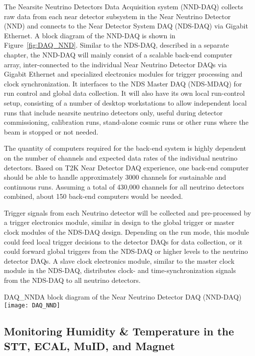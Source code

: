 The Nearsite Neutrino Detectors Data Acquisition system (NND-DAQ) collects raw data from 
each near detector subsystem in the Near Neutrino Detector (NND) and connects to the Near 
Detector System DAQ (NDS-DAQ) via Gigabit Ethernet. A block diagram of the NND-DAQ is
shown in Figure~\ref{fig:DAQ_NND}.
Similar to the NDS-DAQ, described in a separate chapter, the NND-DAQ will mainly consist 
of a scalable back-end computer array, inter-connected to the individual Near Neutrino 
Detector DAQs via Gigabit Ethernet and specialized electronics modules for trigger 
processing and clock synchronization. It interfaces to the NDS Master DAQ (NDS-MDAQ) for 
run control and global data collection. It will also have its own local run-control setup, 
consisting of a number of desktop workstations to allow independent local runs that include 
nearsite neutrino detectors only, useful during detector commissioning, calibration runs, 
stand-alone cosmic runs or other runs where the beam is stopped or not needed.

The quantity of computers required for the back-end system is highly dependent on the 
number of channels and expected data rates of the individual neutrino detectors. Based on 
T2K Near Detector DAQ experience, one back-end computer should be able to handle 
approximately 3000 channels for sustainable and continuous runs. Assuming a total of 
430,000 channels for all neutrino detectors combined, about 150 back-end computers would be 
needed.

Trigger signals from each Neutrino detector will be collected and pre-processed by a 
trigger electronics module, similar in design to the global trigger or master clock modules 
of the NDS-DAQ design. Depending on the run mode, this module could feed local trigger 
decisions to the detector DAQs for data collection, or it could forward global triggers 
from the NDS-DAQ or higher levels to the neutrino detector DAQs.  A slave clock electronics 
module, similar to the master clock module in the NDS-DAQ, distributes clock- and 
time-synchronization signals from the NDS-DAQ to all neutrino detectors.


\begin{cdrfigure}{DAQ_NND}{A block diagram of the Near Neutrino Detector DAQ (NND-DAQ)}
\texttt{[image: DAQ\_NND]}
\end{cdrfigure}


\subsection{Monitoring Humidity \& Temperature in the STT, ECAL, MuID, and Magnet}

